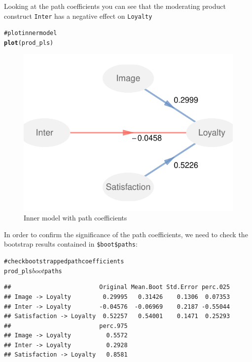 \documentclass[12pt]{book}\usepackage{graphicx, color}
\makeatletter
\newcommand{\hlfunctioncall}[1]{\textcolor[rgb]{0.501960784313725,0,0.329411764705882}{\textbf{#1}}}%
\newcommand{\hlcomment}[1]{\textcolor[rgb]{0.180392156862745,0.6,0.341176470588235}{#1}}%
\newenvironment{kframe}{%
 \def\at@end@of@kframe{}%
 \ifinner\ifhmode%
  \def\at@end@of@kframe{\end{minipage}}%
  \begin{minipage}{\columnwidth}%
 \fi\fi%
 \def\FrameCommand##1{\hskip\@totalleftmargin \hskip-\fboxsep
 \colorbox{shadecolor}{##1}\hskip-\fboxsep
     \hskip-\linewidth \hskip-\@totalleftmargin \hskip\columnwidth}%
 \MakeFramed {\advance\hsize-\width
   \@totalleftmargin\z@ \linewidth\hsize
   \@setminipage}}%
 {\par\unskip\endMakeFramed%
 \at@end@of@kframe}
\newenvironment{knitrout}{}{} %
\newcommand{\code}[1]{\texttt{#1}}
\makeatother
\begin{document}
Looking at the path coefficients you can see that the moderating product construct \texttt{Inter} has a negative effect on \texttt{Loyalty}
\begin{knitrout}
\color{fgcolor}\begin{kframe}
\begin{alltt}
\hlcomment{# plot inner model}
\hlfunctioncall{plot}(prod_pls)
\end{alltt}
\end{kframe}
\end{knitrout}


\begin{knitrout}
\color{fgcolor}\begin{figure}[h]


{\centering \includegraphics[width=.6\linewidth,height=.4\linewidth]{figure/ProdIndApp_plot_inner} 

}

\caption[Inner model with path coefficients]{Inner model with path coefficients\label{fig:ProdIndApp_plot_inner}}
\end{figure}


\end{knitrout}



In order to confirm the significance of the path coefficients, we need to check the bootstrap results contained in \code{\$boot\$paths}:
\begin{knitrout}
\color{fgcolor}\begin{kframe}
\begin{alltt}
\hlcomment{# check bootstrapped path coefficients}
prod_pls$boot$paths
\end{alltt}
\begin{verbatim}
##                         Original Mean.Boot Std.Error perc.025
## Image -> Loyalty         0.29995   0.31426    0.1306  0.07353
## Inter -> Loyalty        -0.04576  -0.06969    0.2187 -0.55044
## Satisfaction -> Loyalty  0.52257   0.54001    0.1471  0.25293
##                         perc.975
## Image -> Loyalty          0.5572
## Inter -> Loyalty          0.2928
## Satisfaction -> Loyalty   0.8581
\end{verbatim}
\end{kframe}
\end{knitrout}
\end{document}
